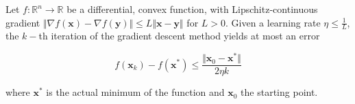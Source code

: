 \documentclass{article}
\numberwithin{equation}{subsection}
\begin{document}
\begin{theorem}
    Let $f : \mathbb{R}^n \to \mathbb{R}$ be a differential, convex function, with Lipschitz-continuous gradient $\Vert \nabla f(\textbf{x}) - \nabla f(\textbf{y}) \Vert \leq L \Vert \textbf{x} - \textbf{y} \Vert $ for $L > 0$. Given a learning rate $\eta \leq \frac{1}{L}$, the $k-$th iteration of the gradient descent method yields at most an error

    \begin{equation}
        f(\textbf{x}_k) - f(\textbf{x}^*) \leq \frac{\Vert \textbf{x}_0 - \textbf{x}^* \Vert}{2 \eta k}
    \end{equation}

    where $\textbf{x}^*$ is the actual minimum of the function and $\textbf{x}_0$ the starting point.
\end{theorem}
\end{document}
